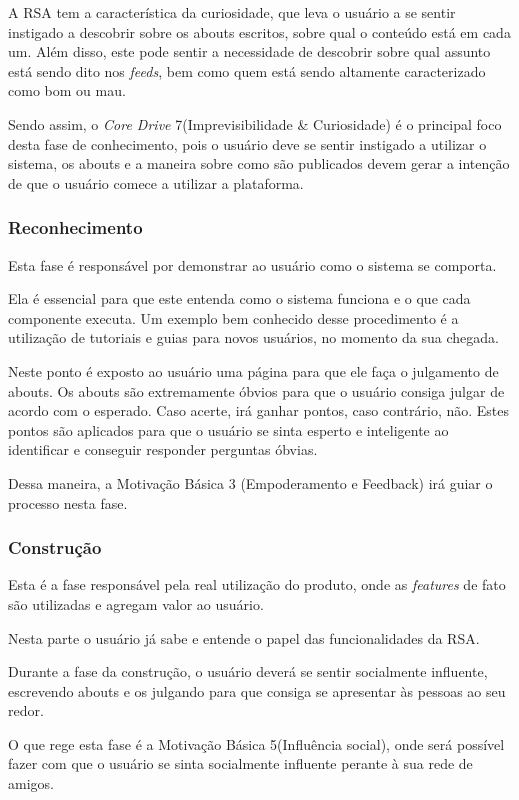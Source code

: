 A RSA tem a característica da curiosidade, que leva o usuário a se sentir instigado
a descobrir sobre os abouts escritos, sobre qual o conteúdo está  em cada
um. Além disso, este pode sentir a necessidade de descobrir sobre qual assunto está
sendo dito nos \textit{feeds}, bem como quem está sendo altamente caracterizado como bom ou mau.

Sendo assim, o \textit{Core Drive} 7(Imprevisibilidade \& Curiosidade) é o principal foco desta fase
de conhecimento, pois o usuário deve se sentir instigado a utilizar o sistema, os abouts
e a maneira sobre como são publicados  devem gerar a intenção de que o usuário comece a utilizar
a plataforma.


\subsubsection{Reconhecimento}
\label{sub:reconhecimento}
Esta fase é responsável por demonstrar ao usuário como o sistema se comporta.

Ela é essencial para que este entenda como o sistema funciona e o que cada
componente executa. Um exemplo bem conhecido desse procedimento é a utilização
de tutoriais e guias para novos usuários, no momento da sua chegada.

Neste ponto é exposto ao usuário uma página para que ele faça o julgamento de 
abouts.
Os abouts são extremamente óbvios para que o usuário consiga julgar de acordo 
com o
esperado. Caso acerte, irá ganhar pontos, caso contrário, não. Estes pontos
são aplicados para que o usuário se sinta esperto e inteligente ao 
identificar e conseguir responder perguntas óbvias.

Dessa maneira, a Motivação Básica 3 (Empoderamento e Feedback) irá guiar o
processo nesta fase.

\subsubsection{Construção}
\label{sub:constru_o}
Esta é a fase responsável pela real utilização do produto, onde as \textit{features}
de fato são utilizadas e agregam valor ao usuário.

Nesta parte o usuário já sabe e entende o papel das funcionalidades da RSA.

Durante a fase da construção, o usuário deverá se sentir socialmente influente,
escrevendo abouts e os julgando para que consiga se apresentar às pessoas ao seu redor.

O que rege esta fase é a Motivação Básica 5(Influência social), onde será possível
fazer com que o usuário se sinta socialmente influente perante à sua rede de amigos.

